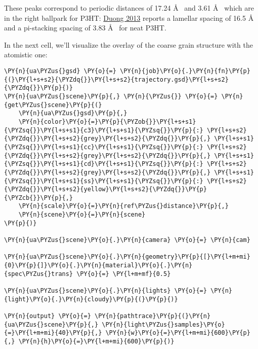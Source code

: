     \begin{center}
    \end{center}

These peaks correspond to periodic distances of 17.24 \AA~ and 3.61 \AA~
which are in the right ballpark for P3HT:
\href{https://www.sciencedirect.com/science/article/pii/S1566119913000840?via\%3Dihub}{Duong
2013} reports a lamellar spacing of 16.5 \AA~ and a pi-stacking spacing of
3.83 \AA~ for neat P3HT.

In the next cell, we'll visualize the overlay of the coarse grain
structure with the atomistic one:

    \begin{tcolorbox}[breakable, size=fbox, boxrule=1pt, pad at break*=1mm,colback=cellbackground, colframe=cellborder]
\begin{Verbatim}[commandchars=\\\{\}]
\PY{n}{ua\PYZus{}gsd} \PY{o}{=} \PY{n}{job}\PY{o}{.}\PY{n}{fn}\PY{p}{(}\PY{l+s+s2}{\PYZdq{}}\PY{l+s+s2}{trajectory.gsd}\PY{l+s+s2}{\PYZdq{}}\PY{p}{)}
\PY{n}{ua\PYZus{}scene}\PY{p}{,} \PY{n}{\PYZus{}} \PY{o}{=} \PY{n}{get\PYZus{}scene}\PY{p}{(}
    \PY{n}{ua\PYZus{}gsd}\PY{p}{,} 
    \PY{n}{color}\PY{o}{=}\PY{p}{\PYZob{}}\PY{l+s+s1}{\PYZsq{}}\PY{l+s+s1}{c3}\PY{l+s+s1}{\PYZsq{}}\PY{p}{:} \PY{l+s+s2}{\PYZdq{}}\PY{l+s+s2}{grey}\PY{l+s+s2}{\PYZdq{}}\PY{p}{,} \PY{l+s+s1}{\PYZsq{}}\PY{l+s+s1}{cc}\PY{l+s+s1}{\PYZsq{}}\PY{p}{:} \PY{l+s+s2}{\PYZdq{}}\PY{l+s+s2}{grey}\PY{l+s+s2}{\PYZdq{}}\PY{p}{,} \PY{l+s+s1}{\PYZsq{}}\PY{l+s+s1}{cd}\PY{l+s+s1}{\PYZsq{}}\PY{p}{:} \PY{l+s+s2}{\PYZdq{}}\PY{l+s+s2}{grey}\PY{l+s+s2}{\PYZdq{}}\PY{p}{,} \PY{l+s+s1}{\PYZsq{}}\PY{l+s+s1}{ss}\PY{l+s+s1}{\PYZsq{}}\PY{p}{:} \PY{l+s+s2}{\PYZdq{}}\PY{l+s+s2}{yellow}\PY{l+s+s2}{\PYZdq{}}\PY{p}{\PYZcb{}}\PY{p}{,} 
    \PY{n}{scale}\PY{o}{=}\PY{n}{ref\PYZus{}distance}\PY{p}{,}
    \PY{n}{scene}\PY{o}{=}\PY{n}{scene}
\PY{p}{)}

\PY{n}{ua\PYZus{}scene}\PY{o}{.}\PY{n}{camera} \PY{o}{=} \PY{n}{cam}

\PY{n}{ua\PYZus{}scene}\PY{o}{.}\PY{n}{geometry}\PY{p}{[}\PY{l+m+mi}{0}\PY{p}{]}\PY{o}{.}\PY{n}{material}\PY{o}{.}\PY{n}{spec\PYZus{}trans} \PY{o}{=} \PY{l+m+mf}{0.5}

\PY{n}{ua\PYZus{}scene}\PY{o}{.}\PY{n}{lights} \PY{o}{=} \PY{n}{light}\PY{o}{.}\PY{n}{cloudy}\PY{p}{(}\PY{p}{)}

\PY{n}{output} \PY{o}{=} \PY{n}{pathtrace}\PY{p}{(}\PY{n}{ua\PYZus{}scene}\PY{p}{,} \PY{n}{light\PYZus{}samples}\PY{o}{=}\PY{l+m+mi}{40}\PY{p}{,} \PY{n}{w}\PY{o}{=}\PY{l+m+mi}{600}\PY{p}{,} \PY{n}{h}\PY{o}{=}\PY{l+m+mi}{600}\PY{p}{)}


\end{Verbatim}
\end{tcolorbox}
